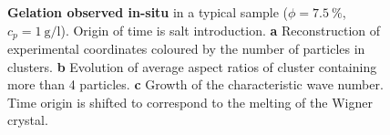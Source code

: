 \begin{figure}
\caption{\textbf{Gelation observed in-situ} in a typical sample ($\phi=7.5~\%$, $c_p=\SI{1}{\gram\per\litre}$). Origin of time is salt introduction. \textbf{a} Reconstruction of experimental coordinates coloured by the number of particles in clusters. \textbf{b} Evolution of average aspect ratios of cluster containing more than 4 particles. \textbf{c} Growth of the characteristic wave number. Time origin is shifted to correspond to the melting of the Wigner crystal.}
\label{fig:wholeprocess}
\end{figure}



